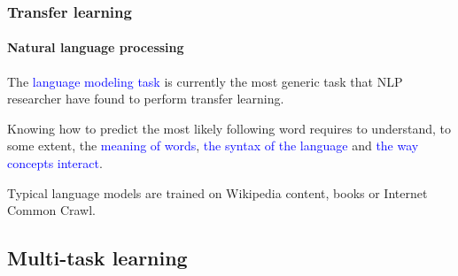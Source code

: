 \documentclass[10pt]{beamer}
\begin{document}
\begin{frame}

  \frametitle{Transfer learning}

  \framesubtitle{Natural language processing}

  \begin{center}
    \scalebox{0.7}{
      
    }
  \end{center}

  The \textcolor{blue}{language modeling task} is currently the most
  generic task that NLP researcher have found to perform transfer
  learning.

  \bigskip

  Knowing how to predict the most likely following word requires to
  understand, to some extent, the \textcolor{blue}{meaning of words},
  \textcolor{blue}{the syntax of the language} and
  \textcolor{blue}{the way concepts interact}.

  \bigskip

  Typical language models are trained on Wikipedia content, books or
  Internet Common Crawl.

\end{frame}

\subsection{Multi-task learning}
\end{document}

